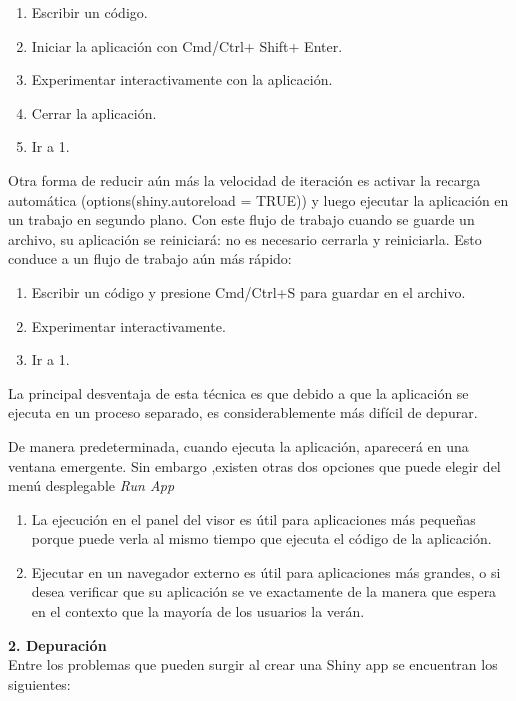 \begin{enumerate}
\item Escribir un código.
\item Iniciar la aplicación con Cmd/Ctrl+ Shift+ Enter.
\item Experimentar interactivamente con la aplicación.
\item Cerrar la aplicación.
\item Ir a 1.
\end{enumerate}


Otra forma de reducir aún más la velocidad de iteración es activar la recarga automática (options(shiny.autoreload = TRUE)) y luego ejecutar la aplicación en un trabajo en segundo plano. Con este flujo de trabajo cuando se guarde un archivo, su aplicación se reiniciará: no es necesario cerrarla y reiniciarla. Esto conduce a un flujo de trabajo aún más rápido:
\begin{enumerate}
\item Escribir un código y presione Cmd/Ctrl+S para guardar en el archivo.
\item Experimentar interactivamente.
\item Ir a 1.
\end{enumerate}
La principal desventaja de esta técnica es que debido a que la aplicación se ejecuta en un proceso separado, es considerablemente más difícil de depurar.


De manera predeterminada, cuando ejecuta la aplicación, aparecerá en una ventana emergente. Sin embargo ,existen otras dos opciones que puede elegir del menú desplegable \emph{Run App}
\begin{enumerate}
\item La ejecución en el panel del visor es útil para aplicaciones más pequeñas porque puede verla al mismo tiempo que ejecuta el código de la aplicación.
\item Ejecutar en un navegador externo es útil para aplicaciones más grandes, o si desea verificar que su aplicación se ve exactamente de la manera que espera en el contexto que la mayoría de los usuarios la verán.
\end{enumerate}


\textbf{2.\hspace{1cm} Depuración}\\


Entre los problemas que pueden surgir al crear una Shiny app se encuentran los siguientes:

